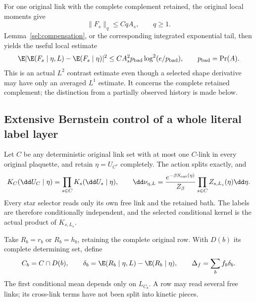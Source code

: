 For one original link with the complete complement retained, the original local moments give
\[
 \|F_s\|_q\le CqA_s,\qquad q\ge1.
\]
Lemma~\ref{sel:compensation}, or the corresponding integrated exponential tail, then yields the useful local estimate
\begin{equation}
 \E|\E(F_s\mid\eta,L)-\E(F_s\mid\eta)|^2
 \le CA_s^2p_{\rm bad}\log^2(e/p_{\rm bad}),
 \qquad p_{\rm bad}=\Pr(A).
 \label{sel:localcontrast}
\end{equation}
This is an actual \(L^2\) contrast estimate even though a selected shape derivative may have only an averaged \(L^1\) estimate. It concerns the complete retained complement; the distinction from a partially observed history is made below.

\subsection{Extensive Bernstein control of a whole literal label layer}

Let \(C\) be any deterministic original link set with at most one \(C\)-link in every original plaquette, and retain \(\eta=U_{C^c}\) completely. The action splits exactly, and
\begin{equation}
 K_C(\dd U_C\mid\eta)=\prod_{s\in C}K_s(\dd U_s\mid\eta),
 \qquad
 \dd\nu_{\eta,L}
 =\frac{e^{-\beta S_{\rm out}(\eta)}}{Z_\beta}
       \prod_{s\in C}Z_{s,L_s}(\eta)\dd\eta .
 \label{sel:jointlaw}
\end{equation}
Every star selector reads only its own free link and the retained bath. The labels are therefore conditionally independent, and the selected conditional kernel is the actual product of \(K_{s,L_s}\).

Take \(R_b=r_b\) or \(R_b=h_b\), retaining the complete original row. With \(D(b)\) its complete determining set, define
\[
 C_b=C\cap D(b),\qquad
 \delta_b=\E(R_b\mid\eta,L)-\E(R_b\mid\eta),\qquad
 \Delta_f=\sum_bf_b\delta_b .
\]
The first conditional mean depends only on \(L_{C_b}\). A row may read several free links; its cross-link terms have not been split into kinetic pieces.

